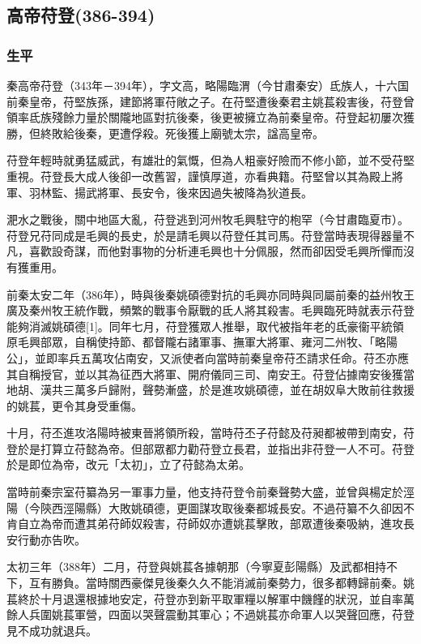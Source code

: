 
\subsection{高帝苻登\tiny(386-394)}

\subsubsection{生平}

秦高帝苻登（343年－394年），字文高，略陽臨渭（今甘肅秦安）氐族人，十六国前秦皇帝，苻堅族孫，建節將軍苻敞之子。在苻堅遭後秦君主姚萇殺害後，苻登曾領率氐族殘餘力量於關隴地區對抗後秦，後更被擁立為前秦皇帝。苻登起初屢次獲勝，但終敗給後秦，更遭俘殺。死後獲上廟號太宗，諡高皇帝。

苻登年輕時就勇猛威武，有雄壯的氣慨，但為人粗豪好險而不修小節，並不受苻堅重視。苻登長大成人後卻一改舊習，謹慎厚道，亦看典籍。苻堅曾以其為殿上將軍、羽林監、揚武將軍、長安令，後來因過失被降為狄道長。

淝水之戰後，關中地區大亂，苻登逃到河州牧毛興駐守的枹罕（今甘肅臨夏市）。苻登兄苻同成是毛興的長史，於是請毛興以苻登任其司馬。苻登當時表現得器量不凡，喜歡設奇謀，而他對事物的分析連毛興也十分佩服，然而卻因受毛興所憚而沒有獲重用。

前秦太安二年（386年），時與後秦姚碩德對抗的毛興亦同時與同屬前秦的益州牧王廣及秦州牧王統作戰，頻繁的戰事令厭戰的氐人將其殺害。毛興臨死時就表示苻登能夠消滅姚碩德[1]。同年七月，苻登獲眾人推舉，取代被指年老的氐豪衞平統領原毛興部眾，自稱使持節、都督隴右諸軍事、撫軍大將軍、雍河二州牧、「略陽公」，並即率兵五萬攻佔南安，又派使者向當時前秦皇帝苻丕請求任命。苻丕亦應其自稱授官，並以其為征西大將軍、開府儀同三司、南安王。苻登佔據南安後獲當地胡、漢共三萬多戶歸附，聲勢漸盛，於是進攻姚碩德，並在胡奴阜大敗前往救援的姚萇，更令其身受重傷。

十月，苻丕進攻洛陽時被東晉將領所殺，當時苻丕子苻懿及苻昶都被帶到南安，苻登於是打算立苻懿為帝。但部眾都力勸苻登立長君，並指出非苻登一人不可。苻登於是即位為帝，改元「太初」，立了苻懿為太弟。

當時前秦宗室苻纂為另一軍事力量，他支持苻登令前秦聲勢大盛，並曾與楊定於涇陽（今陝西涇陽縣）大敗姚碩德，更圖謀攻取後秦都城長安。不過苻纂不久卻因不肯自立為帝而遭其弟苻師奴殺害，苻師奴亦遭姚萇擊敗，部眾遭後秦吸納，進攻長安行動亦告吹。

太初三年（388年）二月，苻登與姚萇各據朝那（今寧夏彭陽縣）及武都相持不下，互有勝負。當時關西豪傑見後秦久久不能消滅前秦勢力，很多都轉歸前秦。姚萇終於十月退還根據地安定，苻登亦到新平取軍糧以解軍中饑饉的狀況，並自率萬餘人兵圍姚萇軍營，四面以哭聲震動其軍心；不過姚萇亦命軍人以哭聲回應，苻登見不成功就退兵。

